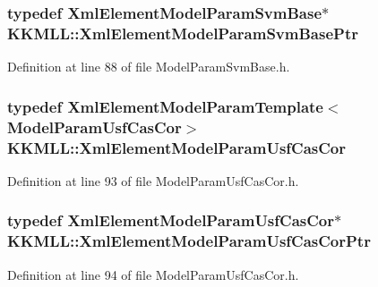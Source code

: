 \subsubsection[{\texorpdfstring{Xml\+Element\+Model\+Param\+Svm\+Base\+Ptr}{XmlElementModelParamSvmBasePtr}}]{\setlength{\rightskip}{0pt plus 5cm}typedef {\bf Xml\+Element\+Model\+Param\+Svm\+Base}$\ast$ {\bf K\+K\+M\+L\+L\+::\+Xml\+Element\+Model\+Param\+Svm\+Base\+Ptr}}\hypertarget{namespace_k_k_m_l_l_a78eea0d0790543ab28f80cde082eb357}{}\label{namespace_k_k_m_l_l_a78eea0d0790543ab28f80cde082eb357}


Definition at line 88 of file Model\+Param\+Svm\+Base.\+h.

\subsubsection[{\texorpdfstring{Xml\+Element\+Model\+Param\+Usf\+Cas\+Cor}{XmlElementModelParamUsfCasCor}}]{\setlength{\rightskip}{0pt plus 5cm}typedef {\bf Xml\+Element\+Model\+Param\+Template}$<${\bf Model\+Param\+Usf\+Cas\+Cor}$>$ {\bf K\+K\+M\+L\+L\+::\+Xml\+Element\+Model\+Param\+Usf\+Cas\+Cor}}\hypertarget{namespace_k_k_m_l_l_af9dabd65f5ed6cd055ba48c7780134b1}{}\label{namespace_k_k_m_l_l_af9dabd65f5ed6cd055ba48c7780134b1}


Definition at line 93 of file Model\+Param\+Usf\+Cas\+Cor.\+h.

\subsubsection[{\texorpdfstring{Xml\+Element\+Model\+Param\+Usf\+Cas\+Cor\+Ptr}{XmlElementModelParamUsfCasCorPtr}}]{\setlength{\rightskip}{0pt plus 5cm}typedef {\bf Xml\+Element\+Model\+Param\+Usf\+Cas\+Cor}$\ast$ {\bf K\+K\+M\+L\+L\+::\+Xml\+Element\+Model\+Param\+Usf\+Cas\+Cor\+Ptr}}\hypertarget{namespace_k_k_m_l_l_a1ce1f9d3d68492696cd353b115e01b34}{}\label{namespace_k_k_m_l_l_a1ce1f9d3d68492696cd353b115e01b34}


Definition at line 94 of file Model\+Param\+Usf\+Cas\+Cor.\+h.

